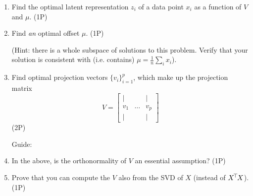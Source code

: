 \begin{enumerate}
\item Find the optimal latent representation $z_i$ of a data point $x_i$ as a function of $V$ and $\mu$. (1P)

\item Find \emph{an} optimal offset $\mu$. (1P)

(Hint: there is a whole subspace of solutions to this problem.  Verify that
your solution is consistent with (i.e.  contains) $\mu = \frac{1}{n} \sum_i
x_i$).

\item Find optimal projection vectors $\{v_i\}_{i=1}^p$, which make up the
projection matrix
\begin{equation}
  V = \begin{bmatrix}
    | & & | \\
    v_1 & \ldots & v_p \\
    | & & |
  \end{bmatrix}
\end{equation} (2P)

Guide:

\item In the above, is the orthonormality of $V$ an essential assumption? (1P)

\item Prove that you can compute the $V$ also from the SVD of $X$ (instead of $X^{\!\top\!} X$). (1P)

\end{enumerate}

